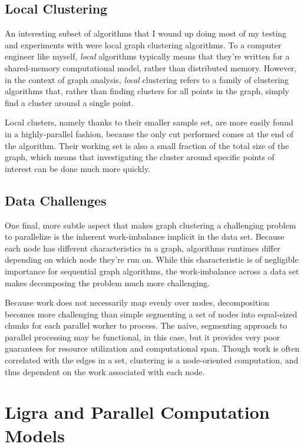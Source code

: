 \subsection{Local Clustering}

An interesting subset of algorithms that I wound up doing most of my
testing and experiments with were local graph clustering algorithms. To
a computer engineer like myself, \emph{local} algorithms typically means
that they're written for a shared-memory computational model, rather
than distributed memory. However, in the context of graph analysis,
\emph{local} clustering refers to a family of clustering algorithms
that, rather than finding clusters for all points in the graph, simply
find a cluster around a single point.

Local clusters, namely thanks to their smaller sample set, are more
easily found in a highly-parallel fashion, because the only cut
performed comes at the end of the algorithm.  Their working set is also
a small fraction of the total size of the graph, which means that
investigating the cluster around specific points of interest can be done
much more quickly.

\subsection{Data Challenges}

One final, more subtle aspect that makes graph clustering a challenging
problem to parallelize is the inherent work-imbalance implicit in the
data set.  Because each node has different characteristics in a graph,
algorithms runtimes differ depending on which node they're run on.
While this characteristic is of negligible importance for sequential
graph algorithms, the work-imbalance across a data set makes decomposing
the problem much more challenging.

Because work does not necessarily map evenly over nodes, decomposition
becomes more challenging than simple segmenting a set of nodes into
equal-sized chunks for each parallel worker to process. The naive,
segmenting approach to parallel processing may be functional, in this
case, but it provides very poor guarantees for resource utilization and
computational span.  Though work is often correlated with the edges in a
set, clustering is a node-oriented computation, and thus dependent on
the work associated with each node.

\section{Ligra and Parallel Computation Models}

